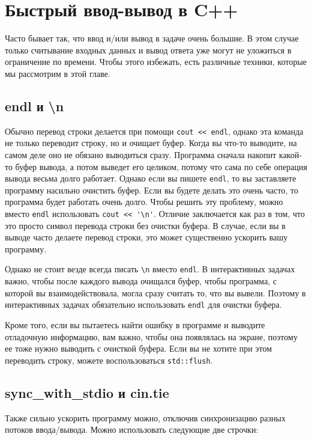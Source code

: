 \chapter{Быстрый ввод-вывод в C++} \label{fastio}

Часто бывает так, что ввод и/или вывод в задаче очень большие. В этом случае только считывание входных данных и вывод ответа уже могут не уложиться в ограничение по времени. Чтобы этого избежать, есть различные техники, которые мы рассмотрим в этой главе.

\section{endl и \textbackslash n}

Обычно перевод строки делается при помощи \verb+cout << endl+, однако эта команда не только переводит строку, но и очищает буфер. Когда вы что-то выводите, на самом деле оно не обязано выводиться сразу. Программа сначала накопит какой-то буфер вывода, а потом выведет его целиком, потому что сама по себе операция вывода весьма долго работает. Однако если вы пишете \verb+endl+, то вы заставляете программу насильно очистить буфер. Если вы будете делать это очень часто, то программа будет работать очень долго. Чтобы решить эту проблему, можно вместо \verb+endl+ использовать \verb+cout << '\n'+. Отличие заключается как раз в том, что это просто символ перевода строки без очистки буфера. В случае, если вы в выводе часто делаете перевод строки, это может существенно ускорить вашу программу.

Однако не стоит везде всегда писать \verb+\n+ вместо \verb+endl+. В интерактивных задачах важно, чтобы после каждого вывода очищался буфер, чтобы программа, с которой вы взаимодействовала, могла сразу считать то, что вы вывели. Поэтому в интерактивных задачах обязательно использовать \verb+endl+ для очистки буфера.

Кроме того, если вы пытаетесь найти ошибку в программе и выводите отладочную информацию, вам важно, чтобы она появлялась на экране, поэтому ее тоже нужно выводить с очисткой буфера. Если вы не хотите при этом переводить строку, можете воспользоваться \verb+std::flush+.

\section{sync\_with\_stdio и cin.tie}

Также сильно ускорить программу можно, отключив синхронизацию разных потоков ввода/вывода. Можно использовать следующие две строчки:

